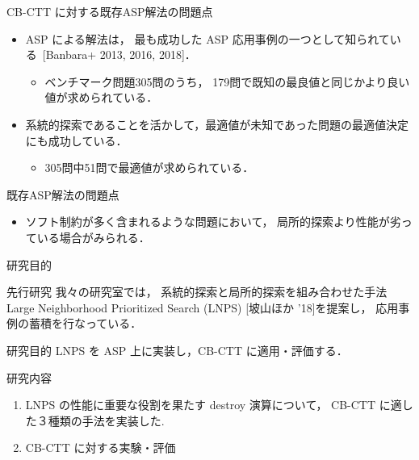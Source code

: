 \documentclass[11pt,dvipdfmx]{beamer}
\begin{document}
\begin{frame}{CB-CTT に対する既存ASP解法の問題点}
  \begin{itemize}
  \item ASP による解法は，
    最も成功した ASP 応用事例の一つとして知られている~[Banbara+ 2013, 2016, 2018]．
    \begin{itemize}
    \item ベンチマーク問題305問のうち，
      179問で既知の最良値と同じかより良い値が求められている．
    \end{itemize}
  \item 系統的探索であることを活かして，最適値が未知であった問題の最適値決定にも成功している．
    \begin{itemize}
    \item 305問中51問で最適値が求められている．
    \end{itemize}
  \end{itemize}
  \begin{alertblock}{既存ASP解法の問題点}
    \begin{itemize}
    \item ソフト制約が多く含まれるような問題において，
      局所的探索より性能が劣っている場合がみられる．
    \end{itemize}
  \end{alertblock}
\end{frame}
\begin{frame}{研究目的}
  \begin{block}{先行研究}
    我々の研究室では，
    系統的探索と局所的探索を組み合わせた手法
    \alert{Large Neighborhood Prioritized Search (LNPS)} [坡山ほか '18]を提案し，
    応用事例の蓄積を行なっている．
  \end{block}

  \begin{alertblock}{研究目的}
    LNPS を ASP 上に実装し，CB-CTT に適用・評価する．
  \end{alertblock}

  \begin{block}{研究内容}
    \begin{enumerate}
    \item LNPS の性能に重要な役割を果たす destroy 演算について，
      CB-CTT に適した３種類の手法を実装した.
    \item CB-CTT に対する実験・評価
    \end{enumerate}
  \end{block}
\end{frame}
\end{document}

